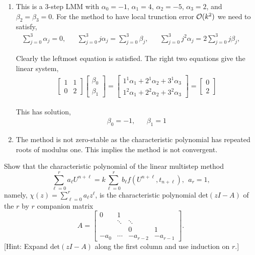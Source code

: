 \documentclass[10pt]{article}
\begin{document}
\begin{solution}[Solution]
\begin{enumerate}[label=(\alph*)]
    \item This is a 3-step LMM with \( \alpha_0 = -1 \), \( \alpha_1 = 4 \), \( \alpha_2=-5 \), \( \alpha_3 = 2 \), and \( \beta_2=\beta_3 = 0 \). For the method to have local trunction error \( \mathcal{O}(k^2) \) we need to satisfy,
    \begin{align*}
        \sum_{j=0}^{3}\alpha_j = 0, &&
        \sum_{j=0}^{3} j \alpha_j = \sum_{j=0}^{3} \beta_j, &&
        \sum_{j=0}^{3} j^2 \alpha_j = 2\sum_{j=0}^{3} j\beta_j, &&
    \end{align*}

    Clearly the leftmost equation is satisfied. The right two equations give the linear system,
    \begin{align*}
        \left[\begin{array}{cc}1 & 1 \\ 0 & 2\end{array}\right]
        \left[\begin{array}{c}\beta_0 \\ \beta_1 \end{array}\right]
        = \left[\begin{array}{c}1^1\alpha_1 + 2^1\alpha_2 + 3^1\alpha_3 \\ 1^2\alpha_1 + 2^2\alpha_2 + 3^2\alpha_3 \end{array}\right]
        = \left[\begin{array}{c}0 \\ 2\end{array}\right]
    \end{align*}

    This has solution,
    \begin{align*}
        \beta_0 = -1 , && \beta_1 = 1
    \end{align*}




    \item The method is not zero-stable as the characteristic polynomial has repeated roots of modulus one. This implies the method is not convergent.

\end{enumerate}

\end{solution}

\begin{problem}[Problem 4]
Show that the characteristic polynomial of the linear multistep method
\[
\sum_{\ell =0}^r a_{\ell} U^{n+ \ell} = k \sum_{\ell = 0}^r b_{\ell} f( U^{n+ \ell} , t_{n+ \ell} ) ,~~
a_r = 1 ,
\]
namely, \(\chi ( z ) = \sum_{\ell = 0}^r a_{\ell} z^{\ell}\), is the characteristic polynomial \(\mbox{det}(zI-A)\) of the \(r\) by \(r\) companion matrix
\[
A = \left[ \begin{array}{cccc}
0 & 1 &        & \\
  & \ddots & \ddots & \\
  &   & 0 & 1 \\
- a_0 & \cdots & - a_{r-2} & - a_{r-1} \end{array} \right] .
\]
[Hint:  Expand \(\mbox{det} (zI - A )\) along the first column and use induction on \(r\).]
\end{problem}
\end{document}
